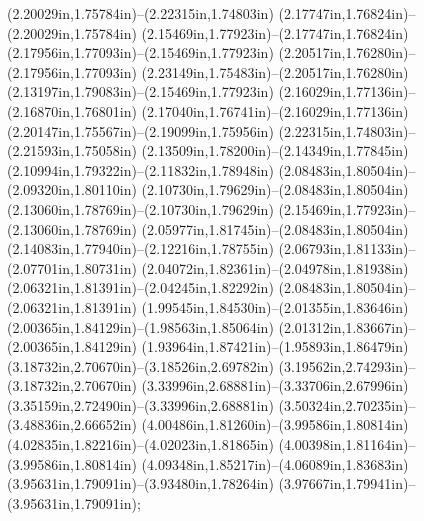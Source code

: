 (2.20029in,1.75784in)--(2.22315in,1.74803in) (2.17747in,1.76824in)--(2.20029in,1.75784in) (2.15469in,1.77923in)--(2.17747in,1.76824in) (2.17956in,1.77093in)--(2.15469in,1.77923in) (2.20517in,1.76280in)--(2.17956in,1.77093in) (2.23149in,1.75483in)--(2.20517in,1.76280in) (2.13197in,1.79083in)--(2.15469in,1.77923in) (2.16029in,1.77136in)--(2.16870in,1.76801in) (2.17040in,1.76741in)--(2.16029in,1.77136in) (2.20147in,1.75567in)--(2.19099in,1.75956in) (2.22315in,1.74803in)--(2.21593in,1.75058in) (2.13509in,1.78200in)--(2.14349in,1.77845in) (2.10994in,1.79322in)--(2.11832in,1.78948in) (2.08483in,1.80504in)--(2.09320in,1.80110in) (2.10730in,1.79629in)--(2.08483in,1.80504in) (2.13060in,1.78769in)--(2.10730in,1.79629in) (2.15469in,1.77923in)--(2.13060in,1.78769in) (2.05977in,1.81745in)--(2.08483in,1.80504in) (2.14083in,1.77940in)--(2.12216in,1.78755in) (2.06793in,1.81133in)--(2.07701in,1.80731in) (2.04072in,1.82361in)--(2.04978in,1.81938in) (2.06321in,1.81391in)--(2.04245in,1.82292in) (2.08483in,1.80504in)--(2.06321in,1.81391in) (1.99545in,1.84530in)--(2.01355in,1.83646in) (2.00365in,1.84129in)--(1.98563in,1.85064in) (2.01312in,1.83667in)--(2.00365in,1.84129in) (1.93964in,1.87421in)--(1.95893in,1.86479in) (3.18732in,2.70670in)--(3.18526in,2.69782in) (3.19562in,2.74293in)--(3.18732in,2.70670in) (3.33996in,2.68881in)--(3.33706in,2.67996in) (3.35159in,2.72490in)--(3.33996in,2.68881in) (3.50324in,2.70235in)--(3.48836in,2.66652in) (4.00486in,1.81260in)--(3.99586in,1.80814in) (4.02835in,1.82216in)--(4.02023in,1.81865in) (4.00398in,1.81164in)--(3.99586in,1.80814in) (4.09348in,1.85217in)--(4.06089in,1.83683in) (3.95631in,1.79091in)--(3.93480in,1.78264in) (3.97667in,1.79941in)--(3.95631in,1.79091in);
